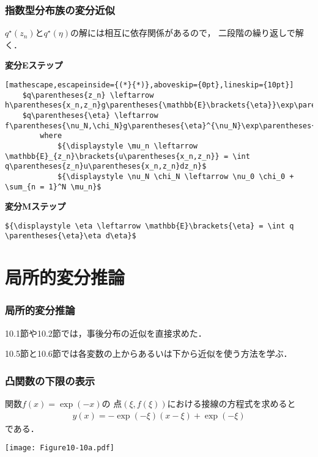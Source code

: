 \documentclass[10pt,usepdftitle=false,hyperref={unicode}]{beamer}
\newcommand{\parentheses}[1]{\left(#1\right)}
\newcommand{\brackets}[1]{\left[#1\right]}
\begin{document}
\begin{frame}[fragile]
\frametitle{指数型分布族の変分近似}
$q^\star\parentheses{z_n}$と$q^\star\parentheses{\eta}$の解には相互に依存関係があるので，
二段階の繰り返しで解く．

\bigskip

\textbf{変分Eステップ}
\begin{lstlisting}[mathescape,escapeinside={(*}{*)},aboveskip={0pt},lineskip={10pt}]
    $q\parentheses{z_n} \leftarrow h\parentheses{x_n,z_n}g\parentheses{\mathbb{E}\brackets{\eta}}\exp\parentheses{\mathbb{E}\brackets{\eta'}u\parentheses{x_n,z_n}}$
    $q\parentheses{\eta} \leftarrow f\parentheses{\nu_N,\chi_N}g\parentheses{\eta}^{\nu_N}\exp\parentheses{\nu_N\eta'\chi_N}$
        where
            ${\displaystyle \mu_n \leftarrow \mathbb{E}_{z_n}\brackets{u\parentheses{x_n,z_n}} = \int q\parentheses{z_n}u\parentheses{x_n,z_n}dz_n}$
            ${\displaystyle \nu_N \chi_N \leftarrow \nu_0 \chi_0 + \sum_{n = 1}^N \mu_n}$
\end{lstlisting}

\smallskip

\textbf{変分Mステップ}
\begin{lstlisting}[mathescape]
    ${\displaystyle \eta \leftarrow \mathbb{E}\brackets{\eta} = \int q \parentheses{\eta}\eta d\eta}$
\end{lstlisting}

\end{frame}

\section{局所的変分推論}
\begin{frame}
\frametitle{局所的変分推論}
10.1節や10.2節では，事後分布の近似を直接求めた．

\bigskip

10.5節と10.6節では各変数の上からあるいは下から近似を使う方法を学ぶ．

\end{frame}

\begin{frame}
\frametitle{凸関数の下限の表示}
関数$f\parentheses{x} = \exp\parentheses{-x}$の
点$\parentheses{\xi,f\parentheses{\xi}}$における接線の方程式を求めると
\begin{align}
    y\parentheses{x} = -\exp\parentheses{-\xi}\parentheses{x - \xi} + \exp\parentheses{-\xi} \tag{10.126}
\end{align}
である．

\smallskip

\begin{center}
    \texttt{[image: Figure10-10a.pdf]}
\end{center}
\end{frame}
\end{document}
